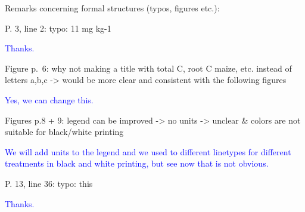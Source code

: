\documentclass[]{article}
\begin{document}
Remarks concerning formal structures (typos, figures etc.):

P. 3, line 2: typo: 11 mg kg-1

\textcolor{blue}{Thanks.}

Figure p.~6: why not making a title with total C, root C maize, etc.
instead of letters a,b,c -\textgreater{} would be more clear and
consistent with the following figures

\textcolor{blue}{Yes, we can change this.}

Figures p.8 + 9: legend can be improved -\textgreater{} no units
-\textgreater{} unclear \& colors are not suitable for black/white
printing

\textcolor{blue}{We will add units to the legend and we used to different linetypes for different treatments in black and white printing, but see now that is not obvious.}

P. 13, line 36: typo: this

\textcolor{blue}{Thanks.}
\end{document}
